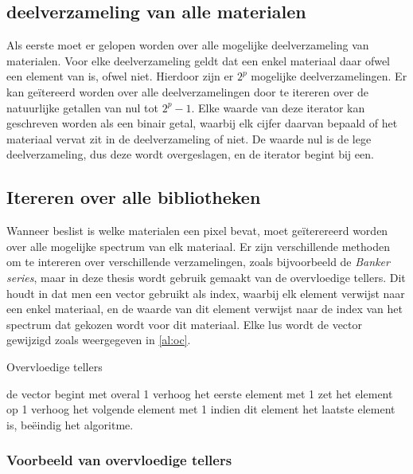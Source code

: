 \documentclass[12pt]{report}
\begin{document}
\subsection{deelverzameling van alle materialen}

Als eerste moet er gelopen worden over alle mogelijke deelverzameling van materialen. Voor elke deelverzameling geldt dat een enkel materiaal daar ofwel een element van is, ofwel niet. Hierdoor zijn er $2^p$ mogelijke deelverzamelingen. Er kan ge\"itereerd worden over alle deelverzamelingen door te itereren over de natuurlijke getallen van nul tot $2^p-1$. Elke waarde van deze iterator kan geschreven worden als een binair getal, waarbij elk cijfer daarvan bepaald of het materiaal vervat zit in de deelverzameling of niet. De waarde nul is de lege deelverzameling, dus deze wordt overgeslagen, en de iterator begint bij een.

\subsection{Itereren over alle bibliotheken}

Wanneer beslist is welke materialen een pixel bevat, moet ge\"iterereerd worden over alle mogelijke spectrum van elk materiaal. Er zijn verschillende methoden om te intereren over verschillende verzamelingen, zoals bijvoorbeeld de \textit{Banker series}, maar in deze thesis wordt gebruik gemaakt van de overvloedige tellers. Dit houdt in dat men een vector gebruikt als index, waarbij elk element verwijst naar een enkel materiaal, en de waarde van dit element verwijst naar de index van het spectrum dat gekozen wordt voor dit materiaal. Elke lus wordt de vector gewijzigd zoals weergegeven in \ref{al:oc}.

\begin{algorithm}
\caption{Overvloedige tellers\label{al:oc}}
\begin{algorithmic}[1]
\State de vector begint met overal 1
\State verhoog het eerste element met 1
\State zet het element op 1
\State verhoog het volgende element met 1
\State indien dit element het laatste element is, be\"eindig het algoritme.
\EndIf
\EndFor
\EndWhile
\end{algorithmic}
\end{algorithm}

\subsubsection{Voorbeeld van overvloedige tellers}
\end{document}
